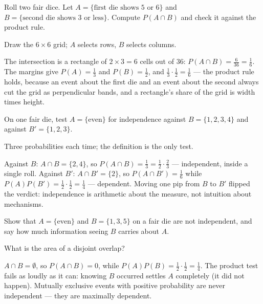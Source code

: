 \begin{problem}
Roll two fair dice. Let $A = \{\text{first die shows 5 or 6}\}$ and
$B = \{\text{second die shows 3 or less}\}$. Compute $P(A \cap B)$ and
check it against the product rule.
\begin{hint}
Draw the $6 \times 6$ grid; $A$ selects rows, $B$ selects columns.
\end{hint}
\begin{solution}
The intersection is a rectangle of $2 \times 3 = 6$ cells out of $36$:
$P(A \cap B) = \tfrac{6}{36} = \tfrac16$. The margins give
$P(A) = \tfrac13$ and $P(B) = \tfrac12$, and
$\tfrac13 \cdot \tfrac12 = \tfrac16$ — the product rule holds, because
an event about the first die and an event about the second always cut
the grid as perpendicular bands, and a rectangle's share of the grid is
width times height.
\end{solution}
\end{problem}

\begin{problem}
On one fair die, test $A = \{\text{even}\}$ for independence against
$B = \{1,2,3,4\}$ and against $B' = \{1,2,3\}$.
\begin{hint}
Three probabilities each time; the definition is the only test.
\end{hint}
\begin{solution}
Against $B$: $A \cap B = \{2,4\}$, so
$P(A \cap B) = \tfrac13 = \tfrac12 \cdot \tfrac23$ — independent,
inside a single roll. Against $B'$: $A \cap B' = \{2\}$, so
$P(A \cap B') = \tfrac16$ while
$P(A)P(B') = \tfrac12 \cdot \tfrac12 = \tfrac14$ — dependent. Moving
one pip from $B$ to $B'$ flipped the verdict: independence is
arithmetic about the measure, not intuition about mechanisms.
\end{solution}
\end{problem}

\begin{problem}
Show that $A = \{\text{even}\}$ and $B = \{1,3,5\}$ on a fair die are
not independent, and say how much information seeing $B$ carries about
$A$.
\begin{hint}
What is the area of a disjoint overlap?
\end{hint}
\begin{solution}
$A \cap B = \emptyset$, so $P(A \cap B) = 0$, while
$P(A)P(B) = \tfrac12 \cdot \tfrac12 = \tfrac14$. The product test fails
as loudly as it can: knowing $B$ occurred settles $A$ completely (it
did not happen). Mutually exclusive events with positive probability
are never independent — they are maximally dependent.
\end{solution}
\end{problem}

